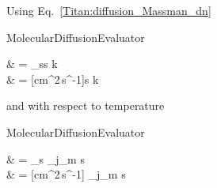 Using Eq.~\ref{Titan:diffusion_Massman_dn}
\begin{equationCode}{MolecularDiffusionEvaluator}
\begin{split}
 & = \diff_s \qquad {}s \neq k \\
\uu \frac{[cm^2\,s^{-1}]}{[cm^{-3}]} 
                          & \uu = [cm^2\,s^{-1}] \qquad {}s \neq k \\
\end{split}
\label{Titan:Ds_dn}
\end{equationCode}
and with respect to temperature
\begin{equationCode}{MolecularDiffusionEvaluator}
\begin{split}
 & = \diff_s 
                                     {\displaystyle\sum_{j_m \neq s} } \\
\uu \frac{[cm^2\,s^{-1}]}{[K]} & \uu = [cm^2\,s^{-1}] 
                                                           {\displaystyle\sum_{j_m \neq s} \frac{[cm^{-3}]}{[cm^2\,s^{-1}]}}
\end{split}
\label{Titan:Ds_dT}
\end{equationCode}

